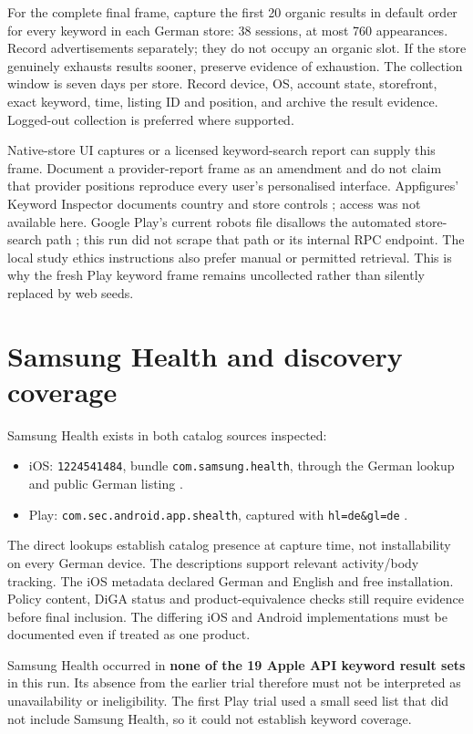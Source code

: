 \documentclass[10pt,a4paper]{article}
\begin{document}
For the complete final frame, capture the first 20 organic results in default
order for every keyword in each German store: 38 sessions, at most 760 appearances.
Record advertisements separately; they do not occupy an organic slot. If the
store genuinely exhausts results sooner, preserve evidence of exhaustion.
The collection window is seven days per store. Record device, OS, account state,
storefront, exact keyword, time, listing ID and position, and archive the result
evidence. Logged-out collection is preferred where supported.

Native-store UI captures or a licensed keyword-search report can supply this
frame. Document a provider-report frame as an amendment and do not claim that
provider positions reproduce every user's personalised interface.
Appfigures' Keyword Inspector documents country and store controls
\cite{keywordinspector}; access was not available here. Google Play's current
robots file disallows the automated store-search path \cite{robots}; this run
did not scrape that path or its internal RPC endpoint. The local study ethics
instructions also prefer manual or permitted retrieval. This is why the fresh
Play keyword frame remains uncollected rather than silently replaced by web seeds.

\section{Samsung Health and discovery coverage}
Samsung Health exists in both catalog sources inspected:
\begin{itemize}
\item iOS: \texttt{1224541484}, bundle \texttt{com.samsung.health}, through the
German lookup and public German listing \cite{samsungios}.
\item Play: \texttt{com.sec.android.app.shealth}, captured with
\texttt{hl=de\&gl=de} \cite{samsungplay}.
\end{itemize}
The direct lookups establish catalog presence at capture time, not installability
on every German device. The descriptions support relevant activity/body tracking.
The iOS metadata declared German and English and free installation. Policy content,
DiGA status and product-equivalence checks still require evidence before final
inclusion. The differing iOS and Android implementations must be documented even
if treated as one product.

Samsung Health occurred in \textbf{none of the 19 Apple API keyword result sets}
in this run. Its absence from the earlier trial therefore must not be interpreted
as unavailability or ineligibility. The first Play trial used a small seed list
that did not include Samsung Health, so it could not establish keyword coverage.
\end{document}
